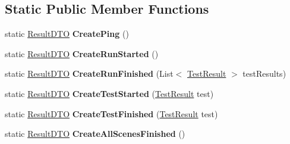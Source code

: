\subsection*{Static Public Member Functions}
\begin{DoxyCompactItemize}
\item 
\mbox{\label{class_unity_test_1_1_result_d_t_o_aebdaa49c8f762ec0945d61c4e91de584}} 
static \hyperlink{class_unity_test_1_1_result_d_t_o}{Result\+D\+TO} {\bfseries Create\+Ping} ()
\item 
\mbox{\label{class_unity_test_1_1_result_d_t_o_a2948ce595b5a2ca1bf76b1a47c2119dd}} 
static \hyperlink{class_unity_test_1_1_result_d_t_o}{Result\+D\+TO} {\bfseries Create\+Run\+Started} ()
\item 
\mbox{\label{class_unity_test_1_1_result_d_t_o_a1907c8e9fd36eb16202f703e8bbb4d7d}} 
static \hyperlink{class_unity_test_1_1_result_d_t_o}{Result\+D\+TO} {\bfseries Create\+Run\+Finished} (List$<$ \hyperlink{class_unity_test_1_1_test_result}{Test\+Result} $>$ test\+Results)
\item 
\mbox{\label{class_unity_test_1_1_result_d_t_o_a74c9811858b8cecf1cb3d5d87d2ffcb2}} 
static \hyperlink{class_unity_test_1_1_result_d_t_o}{Result\+D\+TO} {\bfseries Create\+Test\+Started} (\hyperlink{class_unity_test_1_1_test_result}{Test\+Result} test)
\item 
\mbox{\label{class_unity_test_1_1_result_d_t_o_a1384bbe2c2883249130440a3aa2d78dc}} 
static \hyperlink{class_unity_test_1_1_result_d_t_o}{Result\+D\+TO} {\bfseries Create\+Test\+Finished} (\hyperlink{class_unity_test_1_1_test_result}{Test\+Result} test)
\item 
\mbox{\label{class_unity_test_1_1_result_d_t_o_aded425d2ce25ae9cd103a6827fca0732}} 
static \hyperlink{class_unity_test_1_1_result_d_t_o}{Result\+D\+TO} {\bfseries Create\+All\+Scenes\+Finished} ()
\end{DoxyCompactItemize}
